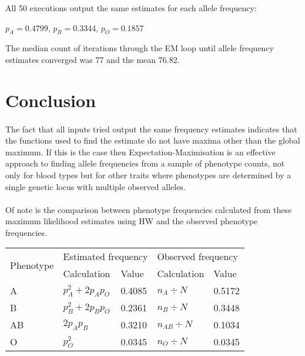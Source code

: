 \documentclass{article}
\begin{document}
	All 50 executions output the same estimates for each allele frequency:
	
	\begin{center} $p_A = 0.4799$, $p_B = 0.3344$, $p_O = 0.1857$ \end{center}
	
	The median count of iterations through the EM loop until allele frequency estimates converged was 77 and the mean 76.82. 
	
	\section{Conclusion}
	
	\paragraph{}The fact that all inputs tried output the same frequency estimates indicates that the functions used to find the estimate do not have maxima other than the global maximum. If this is the case then Expectation-Maximisation is an effective approach to finding allele frequencies from a sample of phenotype counts, not only for blood types but for other traits where phenotypes are determined by a single genetic locus with multiple observed alleles.  
	
	\paragraph{}Of note is the comparison between phenotype frequencies calculated from these maximum likelihood estimates using HW and the observed phenotype frequencies.
	\begin{table}[H]
		\centering
		\begin{tabular}{l|ll|ll}
			\multirow{2}{*}{Phenotype} & \multicolumn{2}{l|}{Estimated frequency}  & \multicolumn{2}{l}{Observed frequency}    \\ \cline{2-5} 
			& \multicolumn{1}{l|}{Calculation} & Value  & \multicolumn{1}{l|}{Calculation} & Value  \\ \hline
			A                          & $p_A^2 + 2p_Ap_O$                & 0.4085 & $n_A \div N$                     & 0.5172 \\
			B                          & $p_B^2 + 2p_Bp_O$                & 0.2361 & $n_B \div N$                     & 0.3448 \\
			AB                         & $2p_Ap_B$                        & 0.3210 & $n_{AB} \div N$                  & 0.1034 \\
			O                          & $p_O^2$                          & 0.0345 & $n_O \div N$                     & 0.0345
		\end{tabular}
	\end{table}
\end{document}
